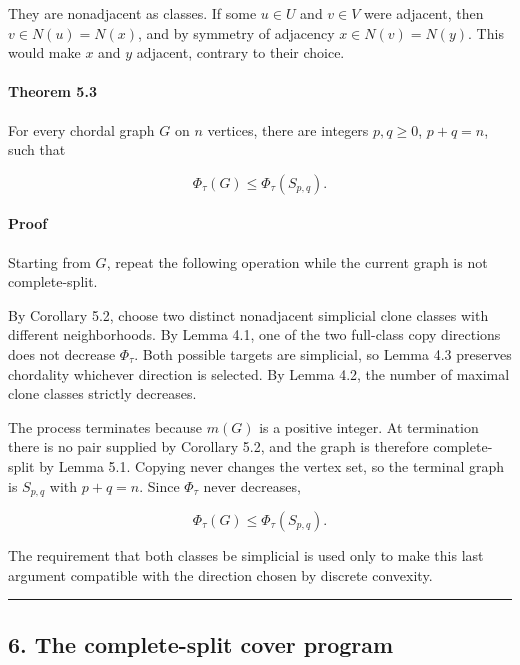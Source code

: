 \documentclass[
  american,
  11pt,
  a4paper,
]{article}
\begin{document}
They are nonadjacent as classes. If some \(u\in U\) and \(v\in V\) were adjacent, then \(v\in N(u)=N(x)\), and by symmetry of adjacency \(x\in N(v)=N(y)\). This would make \(x\) and \(y\) adjacent, contrary to their choice.

\paragraph{Theorem 5.3}\label{theorem-5.3}

For every chordal graph \(G\) on \(n\) vertices, there are integers \(p,q\ge0\), \(p+q=n\), such that

\[
\boxed{
\Phi_\tau(G)\le\Phi_\tau(S_{p,q}).
}
\]

\paragraph{Proof}\label{proof-7}

Starting from \(G\), repeat the following operation while the current graph is not complete-split.

By Corollary 5.2, choose two distinct nonadjacent simplicial clone classes with different neighborhoods. By Lemma 4.1, one of the two full-class copy directions does not decrease \(\Phi_\tau\). Both possible targets are simplicial, so Lemma 4.3 preserves chordality whichever direction is selected. By Lemma 4.2, the number of maximal clone classes strictly decreases.

The process terminates because \(m(G)\) is a positive integer. At termination there is no pair supplied by Corollary 5.2, and the graph is therefore complete-split by Lemma 5.1. Copying never changes the vertex set, so the terminal graph is \(S_{p,q}\) with \(p+q=n\). Since \(\Phi_\tau\) never decreases,

\[
\Phi_\tau(G)\le\Phi_\tau(S_{p,q}).
\]

The requirement that both classes be simplicial is used only to make this last argument compatible with the direction chosen by discrete convexity.

\begin{center}\rule{0.5\linewidth}{0.5pt}\end{center}

\subsection{6. The complete-split cover program}\label{the-complete-split-cover-program}
\end{document}
